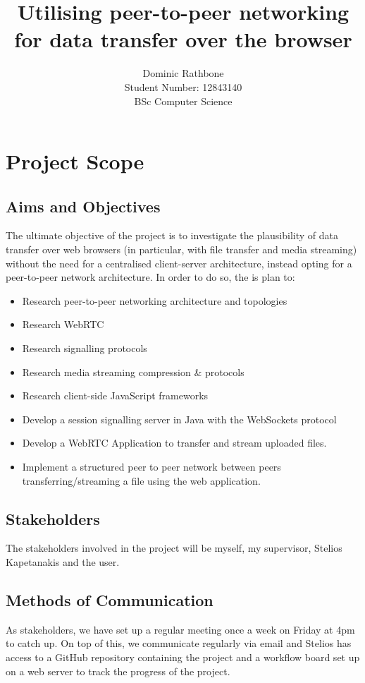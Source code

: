 \documentclass[]{report}
\title{Utilising peer-to-peer networking for data transfer over the browser}
\author{Dominic Rathbone \\ Student Number: 12843140 \\ BSc Computer Science}
\begin{document}
\maketitle
\tableofcontents

\chapter{Project Scope}
\section{Aims and Objectives}
	The ultimate objective of the project is to investigate the plausibility of data transfer over web browsers (in particular, with file transfer and media streaming) without the need for a centralised client-server architecture, instead opting for a peer-to-peer network architecture. In order to do so, the is plan to:
	\begin{itemize}
		\item Research peer-to-peer networking architecture and topologies
		\item Research WebRTC
		\item Research signalling protocols
		\item Research media streaming compression \& protocols
		\item Research client-side JavaScript frameworks
		\item Develop a session signalling server in Java with the WebSockets protocol
		\item Develop a WebRTC Application to transfer and stream uploaded files.
		\item Implement a structured peer to peer network between peers transferring/streaming a file using the web application.
	\end{itemize}
\section{Stakeholders}
	The stakeholders involved in the project will be myself, my supervisor, Stelios Kapetanakis and the user.
\section{Methods of Communication}
	As stakeholders, we have set up a regular meeting once a week on Friday at 4pm to catch up. On top of this, we communicate regularly via email and Stelios has access to a GitHub repository containing the project and a workflow board set up on a web server to track the progress of the project. 
	
\end{document}
